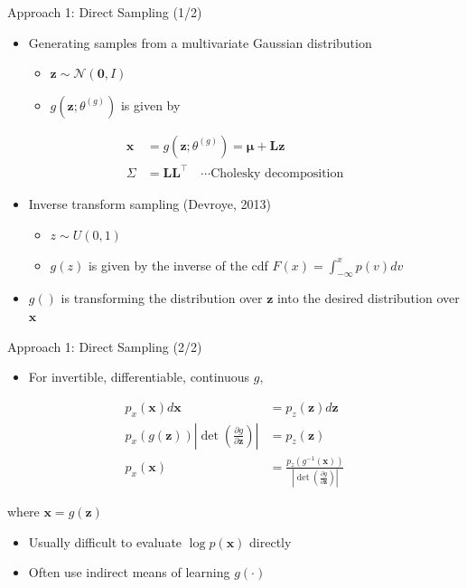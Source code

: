 \documentclass[dvipdfmx,presentation]{beamer}
\def\bf{\mathbf}
\begin{document}
\begin{frame}[label={sec:orgheadline15}]{Approach 1: Direct Sampling (1/2)}
\begin{itemize}
\item Generating samples from a multivariate Gaussian distribution
\begin{itemize}
\item \(\bf{z} \sim \mathcal{N}(\bf{0}, I)\)
\item \(g(\bf{z}; \theta^{(g)})\) is given by
\end{itemize}
\end{itemize}
\begin{align*}
\bf{x} &= g(\bf{z}; \theta^{(g)}) = \bf{\mu} + \bf{L} \bf{z} \tag{20.71}\\
\Sigma &= \bf{L} \bf{L}^{\top} \quad \cdots \text{Cholesky decomposition}
\end{align*}

\begin{itemize}
\item Inverse transform sampling (Devroye, 2013)
\begin{itemize}
\item \(z \sim U(0, 1)\)
\item \(g(z)\) is given by the inverse of the cdf \(F(x) = \int_{-\infty}^{x} p(v) dv\)
\end{itemize}

\item \(g()\) is transforming the distribution over \(\bf{z}\) into the desired distribution over \(\bf{x}\)
\end{itemize}
\end{frame}

\begin{frame}[label={sec:orgheadline16}]{Approach 1: Direct Sampling (2/2)}
\begin{itemize}
\item For invertible, differentiable, continuous \(g\),
\end{itemize}

\begin{align*}
p_{x}(\bf{x}) d \bf{x} &= p_{z}(\bf{z}) d \bf{z} \\
p_{x}(g(\bf{z})) \left| \det (\frac{\partial g}{\partial \bf{z}}) \right| &= p_{z}(\bf{z}) \tag{20.72} \\
p_{x}(\bf{x}) &= \frac{p_{z}(g^{-1}(\bf{x}))}{\left| \det (\frac{\partial g}{\partial \bf{z}}) \right|} \tag{20.73}
\end{align*}

where \(\bf{x} = g(\bf{z})\)

\begin{itemize}
\item Usually difficult to evaluate \(\log p(\bf{x})\) directly
\item Often use indirect means of learning \(g(\cdot)\)
\end{itemize}
\end{frame}
\end{document}
